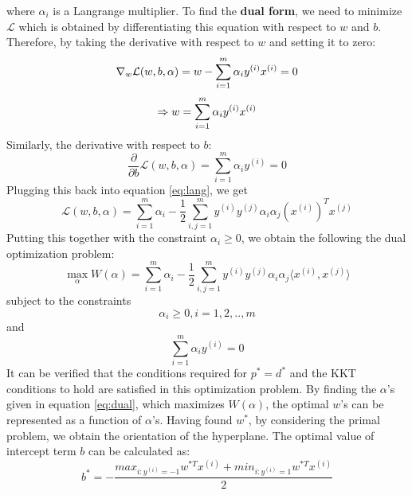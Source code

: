 \documentclass[12pt]{report}			%
\begin{document}
where $\alpha_{i}$ is a Langrange multiplier. To find the \textbf{dual form}, we need to minimize $\mathcal{L}$ which is obtained by differentiating this equation with respect to $w$ and $b$.
Therefore, by taking the derivative with respect to $w$ and setting it to zero:
\begin{equation}
\nabla_{w} \mathcal{L}(w,b,\alpha) = w - \sum_{i=1}^{m} \alpha_{i} y^{(i)} x^{(i)} = 0\\
\end{equation}
\begin{equation} \label{eq:w}
\Rightarrow w = \sum_{i=1}^{m} \alpha_{i} y^{(i)} x^{(i)}\\
\end{equation}
Similarly, the derivative with respect to $b$:
\begin{equation} \label{eq:ay}
\dfrac{\partial}{\partial b} \mathcal{L}(w,b,\alpha) = \sum_{i=1}^{m} \alpha_{i} y^{(i)} = 0
\end{equation}
Plugging this back into equation \ref{eq:lang}, we get
\begin{equation}
\mathcal {L}(w, b, \alpha) = \sum_{i=1}^{m} \alpha_i - \frac{1}{2} \sum_{i,j=1}^{m} y^{(i)}y^{(j)}\alpha_i \alpha_j (x^{(i)})^T x^{(j)}
\end{equation}
Putting this together with the constraint $\alpha_i \geq 0$, we obtain the following the dual optimization problem:
\begin{equation} \label{eq:dual}
\max_{\alpha} W(\alpha) = \sum_{i=1}^{m} \alpha_i - \frac{1}{2} \sum_{i,j=1}^{m} y^{(i)}y^{(j)}\alpha_i \alpha_j \langle x^{(i)}, x^{(j)}\rangle
\end{equation}
subject to the constraints
\begin{equation}
\alpha_{i} \geq 0, i = 1,2,..,m
\end{equation}
and
\begin{equation}
\sum_{i=1}^{m} \alpha_{i}y^{(i)} = 0
\end{equation}
It can be verified that the conditions required for $p^*=d^*$ and the KKT conditions to hold are satisfied in this optimization problem.
By finding the $\alpha$'s given in equation \ref{eq:dual}, which maximizes $W(\alpha)$, the optimal $w$'s can be represented as a function of $\alpha$'s.
Having found $w^{*}$, by considering the primal problem, we obtain the orientation of the hyperplane.
The optimal value of intercept term $b$ can be calculated as:
\begin{equation}
b^{*} = - \frac {max_{i:y^{(i)}=-1}w^{*T}x^{(i)} + min_{i:y^{(i)}=1}w^{*T}x^{(i)}} {2}
\end{equation}
\end{document}

